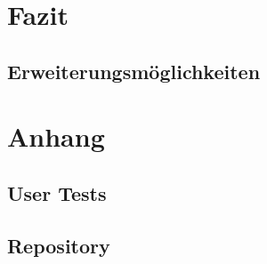 \documentclass[11pt]{scrartcl}
\begin{document}
\newpage
\section{Fazit}
\subsection{Erweiterungsmöglichkeiten}
\label{subsec:improvements}
\newpage
\section{Anhang}
\label{sec:appendix}
\subsection{User Tests}
\subsection{Repository}


\end{document}
